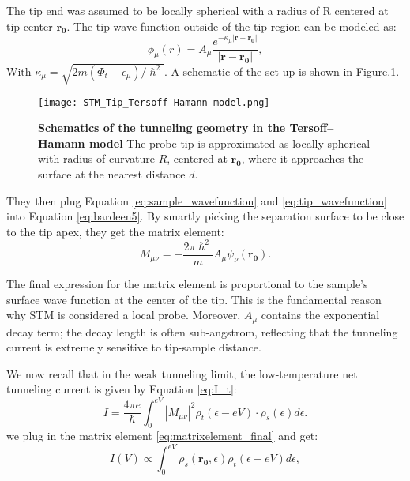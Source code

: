 The tip end was assumed to be locally spherical with a radius of R centered at tip center $\mathbf{r_0}$. The tip wave function outside of the tip region can be modeled as:
\begin{equation}
	\label{eq:tip_wavefunction}
	\phi_{\mu}(r) = A_{\mu} \frac{e^{-\kappa_{\mu} |\mathbf{r-r_0}|}}{|\mathbf{r-r_0}|},
\end{equation}
With $\kappa_{\mu} = \sqrt{2m(\Phi_t-\epsilon_{\mu})/\hslash^2}$. A schematic of the set up is shown in Figure.\ref{fig:tersoff}. 
\begin{figure}
	\centering
	\texttt{[image: STM\_Tip\_Tersoff-Hamann model.png]}
	\caption[\textbf{Schematics of the tunneling geometry in the Tersoff–Hamann model}]{\textbf{Schematics of the tunneling geometry in the Tersoff–Hamann model} The probe tip is approximated as locally spherical with radius of curvature $R$, centered at $\mathbf{r_0}$, where it approaches the surface at the nearest distance $d$.}
	\label{fig:tersoff}
\end{figure}

They then plug Equation \ref{eq:sample_wavefunction} and \ref{eq:tip_wavefunction} into Equation \ref{eq:bardeen5}. By smartly picking the separation surface to be close to the tip apex, they get the matrix element: 
\begin{equation}
	\label{eq:matrixelement_final}
	M_{\mu \nu} = -\frac{2\pi\hslash^2}{m}A_{\mu}\psi_{\nu}(\mathbf{r_0}).
\end{equation}

The final expression for the matrix element is proportional to the sample's surface wave function at the center of the tip. This is the fundamental reason why \ac{STM} is considered a local probe. Moreover, $A_{\mu}$ contains the exponential decay term; the decay length is often sub-angstrom, reflecting that the tunneling current is extremely sensitive to tip-sample distance. 

We now recall that in the weak tunneling limit, the low-temperature net tunneling current is given by Equation \ref{eq:I_t}:
\begin{equation}
	I = \frac{4\pi e}{\hslash} \int_0^{eV}|M_{\mu \nu}|^2 \rho_t(\epsilon - eV) \cdot \rho_s(\epsilon) d\epsilon.
\end{equation}
we plug in the matrix element \ref{eq:matrixelement_final} and get:
\begin{equation}
	I(V) \propto \int_0^{eV}  \rho_s(\mathbf{r_0},\epsilon) \rho_t(\epsilon-eV) d\epsilon,
\end{equation}

